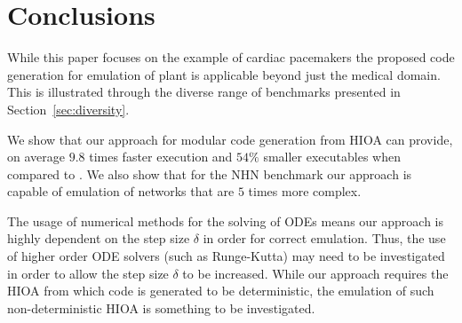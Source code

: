 \section{Conclusions}

While this paper focuses on the example of cardiac pacemakers the proposed code generation for emulation of plant is applicable beyond just the medical domain.
This is illustrated through the diverse range of benchmarks presented in Section~\ref{sec:diversity}.

We show that our approach for modular code generation from \ac{HIOA} can 
provide, on average $9.8$ times faster execution and $54\%$ smaller executables 
when compared to \simulink.
We also show that for the \acf{NHN} benchmark our approach is capable of 
emulation of networks that are $5$ times more complex.

The usage of numerical methods for the solving of \acp{ODE} means our approach is highly dependent on the step size $\delta$ in order for correct emulation.
Thus, the use of higher order \ac{ODE} solvers (such as Runge-Kutta) may need to be investigated in order to allow the step size $\delta$ to be increased.
While our approach requires the \ac{HIOA} from which code is generated to be 
deterministic, the emulation of such non-deterministic \ac{HIOA} is something 
to be investigated.
